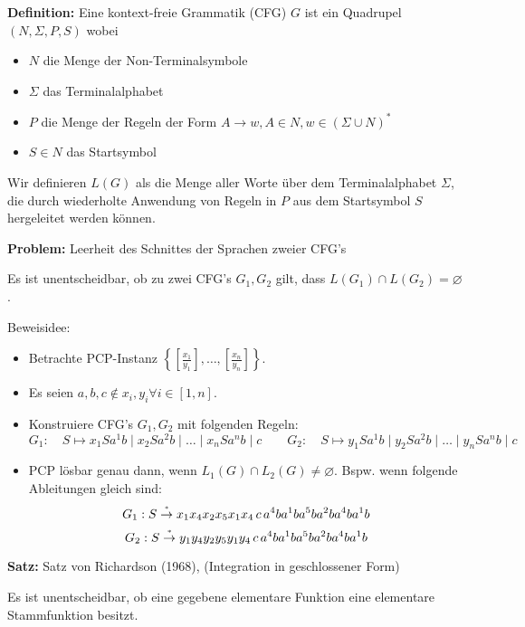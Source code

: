 \documentclass[a4paper,graphics,11pt]{article}
\newcommand{\up}[2]{\mathrel{\overset{\makebox[0pt]{\mbox{\normalfont\tiny #2}}}{#1}}}
\begin{document}
\textbf{Definition:} Eine kontext-freie Grammatik (CFG) $G$ ist ein Quadrupel $(N, \Sigma, P, S)$
wobei
\begin{itemize}
    \item $N$ die Menge der Non-Terminalsymbole
    \item $\Sigma$ das Terminalalphabet
    \item $P$ die Menge der Regeln der Form $A \to w, A \in N, w \in (\Sigma \cup N)^*$
    \item $S \in N$ das Startsymbol
\end{itemize}

Wir definieren $L(G)$ als die Menge aller Worte über dem Terminalalphabet $\Sigma$, die
durch wiederholte Anwendung von Regeln in $P$ aus dem Startsymbol $S$ hergeleitet werden können.

\strut

\textbf{Problem:} Leerheit des Schnittes der Sprachen zweier CFG's

Es ist unentscheidbar, ob zu zwei CFG's $G_1,G_2$ gilt, dass $L(G_1) \cap L(G_2) = \varnothing$.

Beweisidee:
\begin{itemize}
    \item Betrachte PCP-Instanz
        $\displaystyle\left\{\left[\frac{x_1}{y_1}\right],\dots,\left[\frac{x_n}{y_n} \right]\right\}$.\\
    \item Es seien $a,b,c \notin x_i,y_i \forall i \in [1,n]$.
    \item Konstruiere CFG's $G_1,G_2$ mit folgenden Regeln:
        $$
            G_1:\quad S\mapsto x_1Sa^1b \mid x_2 Sa^2b \mid \dots \mid x_n Sa^nb \mid c
            \qquad
            G_2:\quad S\mapsto y_1Sa^1b \mid y_2 Sa^2b \mid \dots \mid y_n Sa^nb \mid c
        $$
    \item PCP lösbar genau dann, wenn $L_1(G) \cap L_2(G) \neq \varnothing$. Bspw.
        wenn folgende Ableitungen gleich sind:
        $$
            G_1 : S \up{\to}{*} x_1x_4x_2x_5x_1x_4\,c\,a^4ba^1ba^5ba^2ba^4ba^1b
        $$$$
            G_2 : S \up{\to}{*} y_1y_4y_2y_5y_1y_4\,c\,a^4ba^1ba^5ba^2ba^4ba^1b
        $$
\end{itemize}

\newpage

\textbf{Satz:} Satz von Richardson (1968), (Integration in geschlossener Form)

Es ist unentscheidbar, ob eine gegebene elementare Funktion eine elementare Stammfunktion besitzt.
\end{document}
